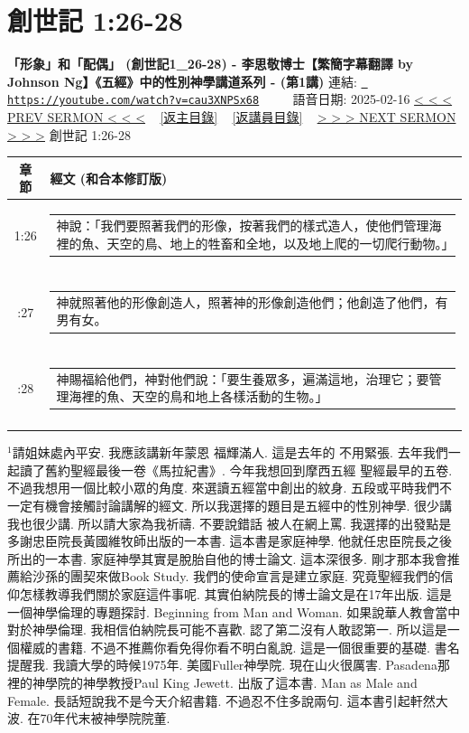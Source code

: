 \documentclass{book}
\begin{document}
\section{創世記 1:26-28}
\label{sec:cau3XNPSx68}
\textbf{「形象」和「配偶」 (創世記1\_26-28) - 李思敬博士【繁簡字幕翻譯 by Johnson Ng】《五經》中的性別神學講道系列 - (第1講)}
\newline
\newline
連結: \href{https://youtube.com/watch?v=cau3XNPSx68}{\texttt{ https://youtube.com/watch?v=cau3XNPSx68}} ~~~~ 語音日期: 2025-02-16 
\newline
\newline
\hyperref[sec:K8E95o7ZcvU]{< < < PREV SERMON < < <}
~
\hyperlink{toc}{[返主目錄]}
~
\hyperref[ch:preacher2]{[返講員目錄]}
~
\hyperref[sec:YdX9gstJs1g]{> > > NEXT SERMON > > >}
\newline
\newline
創世記 1:26-28
\newline
\begin{longtable}{cl}
\hline
\hline
章節 & 經文 (和合本修訂版)\\
\hline
1:26 & \begin{tabularx}{0.7\textwidth}{X} 神說：「我們要照著我們的形像，按著我們的樣式造人，使他們管理海裡的魚、天空的鳥、地上的牲畜和全地，以及地上爬的一切爬行動物。」 \end{tabularx} \\ \\ \relax
1:27 & \begin{tabularx}{0.7\textwidth}{X} 神就照著他的形像創造人，照著神的形像創造他們；他創造了他們，有男有女。 \end{tabularx} \\ \\ \relax
1:28 & \begin{tabularx}{0.7\textwidth}{X} 神賜福給他們，神對他們說：「要生養眾多，遍滿這地，治理它；要管理海裡的魚、天空的鳥和地上各樣活動的生物。」 \end{tabularx} \\ \\
[1ex]
\hline
\hline
\end{longtable}
$^{1}$請姐妹處內平安.
我應該講新年蒙恩 福輝滿人.
這是去年的 不用緊張.
去年我們一起讀了舊約聖經最後一卷《馬拉紀書》.
今年我想回到摩西五經 聖經最早的五卷.
不過我想用一個比較小眾的角度.
來選讀五經當中創出的紋身.
五段或平時我們不一定有機會接觸討論講解的經文.
所以我選擇的題目是五經中的性別神學.
很少講 我也很少講.
所以請大家為我祈禱.
不要說錯話 被人在網上罵.
我選擇的出發點是多謝忠臣院長黃國維牧師出版的一本書.
這本書是家庭神學.
他就任忠臣院長之後所出的一本書.
家庭神學其實是脫胎自他的博士論文.
這本深很多.
剛才那本我會推薦給沙孫的團契來做Book Study.
我們的使命宣言是建立家庭.
究竟聖經我們的信仰怎樣教導我們關於家庭這件事呢.
其實伯納院長的博士論文是在17年出版.
這是一個神學倫理的專題探討.
Beginning from Man and Woman.
如果說華人教會當中對於神學倫理.
我相信伯納院長可能不喜歡.
認了第二沒有人敢認第一.
所以這是一個權威的書籍.
不過不推薦你看免得你看不明白亂說.
這是一個很重要的基礎.
書名提醒我.
我讀大學的時候1975年.
美國Fuller神學院.
現在山火很厲害.
Pasadena那裡的神學院的神學教授Paul King Jewett.
出版了這本書.
Man as Male and Female.
長話短說我不是今天介紹書籍.
不過忍不住多說兩句.
這本書引起軒然大波.
在70年代末被神學院院董.
\end{document}
